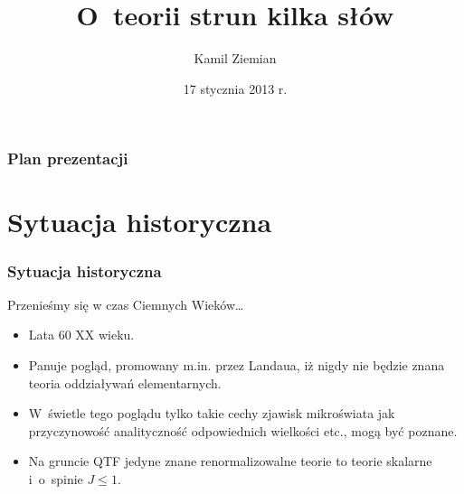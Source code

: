 \documentclass[10pt,t]{beamer}
\title{O~teorii strun kilka słów}
\author{Kamil Ziemian}
\institute{II rok, fizyka teoretyczna, studia magisterskie}
\date[17 I 2013]{17 stycznia 2013 r.}
\begin{document}






\RaggedRight





\maketitle %






\begin{frame}
  \frametitle{Plan prezentacji}


  \tableofcontents %

\end{frame}





\section{Sytuacja historyczna}



\begin{frame}
  \frametitle{Sytuacja historyczna}


  Przenieśmy się w czas Ciemnych Wieków\ldots
  \begin{itemize}

  \item Lata 60 XX wieku.

  \item Panuje pogląd, promowany m.in. przez Landaua, iż nigdy nie
    będzie znana teoria oddziaływań elementarnych.

  \item W~świetle tego poglądu tylko takie cechy zjawisk mikroświata
    jak przyczynowość analityczność odpowiednich wielkości etc.,
    mogą być poznane.

  \item Na gruncie QTF jedyne znane renormalizowalne teorie to
    teorie skalarne i~o~spinie $J \leq 1$.

  \end{itemize}

\end{frame}
\end{document}
